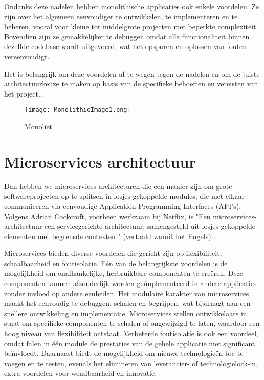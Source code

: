Ondanks deze nadelen hebben monolithische applicaties ook enkele voordelen. Ze zijn over het algemeen eenvoudiger te ontwikkelen, te implementeren en te beheren, vooral voor kleine tot middelgrote projecten met beperkte complexiteit. Bovendien zijn ze gemakkelijker te debuggen omdat alle functionaliteit binnen dezelfde codebase wordt uitgevoerd, wat het opsporen en oplossen van fouten vereenvoudigt.


Het is belangrijk om deze voordelen af te wegen tegen de nadelen en om de juiste architectuurkeuze te maken op basis van de specifieke behoeften en vereisten van het project.\autocite{Alexandra2022}.

\begin{figure}[H]
	\centering	
	\texttt{[image: MonolithicImage1.png]} 
	\caption{Monoliet} 
	\label{fig:MonolietBP} 
\end{figure}
\FloatBarrier

\section{Microservices architectuur}
Dan hebben we microservices architecturen die een manier zijn  om grote softwareprojecten op te splitsen in losjes gekoppelde modules, die met elkaar communiceren via eenvoudige Application Programming Interfaces (API's). Volgens Adrian Cockcroft, voorheen werkzaam bij Netflix, is "Een microservices-architectuur een servicegerichte architectuur, samengesteld uit losjes gekoppelde elementen met begrensde contexten " (vertaald vanuit het Engels) \cite{Richardson2018}.

Microservices bieden diverse voordelen die gericht zijn op flexibiliteit, schaalbaarheid en foutisolatie. Eén van de belangrijkste voordelen is de mogelijkheid om onafhankelijke, herbruikbare componenten te creëren. Deze componenten kunnen afzonderlijk worden geïmplementeerd in andere applicaties zonder invloed op andere eenheden. Het modulaire karakter van microservices maakt het eenvoudig te debuggen, schalen en begrijpen, wat bijdraagt aan een snellere ontwikkeling en implementatie. 
Microservices stellen ontwikkelaars in staat om specifieke componenten te schalen of ongewijzigd te laten, waardoor een hoog niveau van flexibiliteit ontstaat. Verbeterde foutisolatie is ook een voordeel, omdat falen in één module de prestaties van de gehele applicatie niet significant beïnvloedt. Daarnaast biedt de mogelijkheid om nieuwe technologieën toe te voegen en te testen, evenals het elimineren van leverancier- of technologielock-in, extra voordelen voor wendbaarheid en innovatie. 

